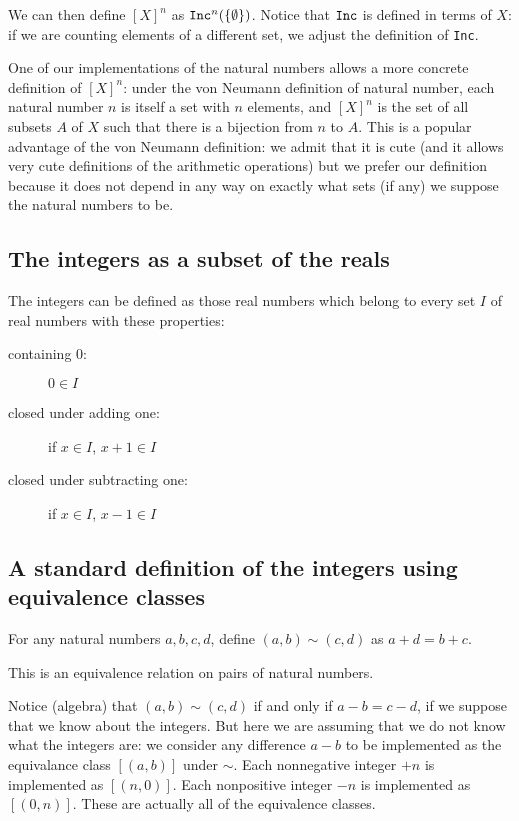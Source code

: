 \documentclass[12pt]{article}
\begin{document}
We can then define $[X]^n$ as ${\tt Inc}^n(\{\emptyset\})$.  Notice that ${\tt Inc}$ is defined in terms of $X$:  if we are counting elements of a different set, we adjust the definition of {\tt Inc}.

One of our implementations of the natural numbers allows a more concrete definition of $[X]^n$:  under the von Neumann
definition of natural number, each natural number $n$ is itself a set with $n$ elements, and $[X]^n$ is the set of all subsets $A$ of $X$  such that there is a bijection from $n$ to $A$.   This is a popular advantage of the von Neumann definition:  we admit that it is cute (and it allows very cute definitions of the arithmetic operations) but we prefer our definition because it does not depend in any way on exactly what sets (if any) we suppose the natural numbers to be.

\subsection{The integers as a subset of the reals}

The integers can be defined as those real numbers which belong to every set $I$ of real numbers with these properties:

\begin{description}

\item[containing 0:]  $0 \in I$

\item[closed under adding one:]  if $x\in I$, $x+1 \in I$

\item[closed under subtracting one:]  if $x \in I$, $x-1 \in I$

\end{description}


\subsection{A standard definition of the integers using equivalence classes}

For any natural numbers $a,b,c,d$, define $(a,b) \sim (c,d)$ as $a+d=b+c$.

This is an equivalence relation on pairs of natural numbers.

Notice (algebra) that $(a,b) \sim (c,d)$ if and only if $a-b = c-d$, if we suppose that we know about the integers.
But here we are assuming that we do not know what the integers are:  we consider any difference $a-b$ to be implemented
as the equivalance class $[(a,b)]$ under $\sim$.  Each nonnegative integer $+n$ is implemented as $[(n,0)]$.
Each nonpositive integer $-n$ is implemented as $[(0,n)]$.  These are actually all of the equivalence classes.
\end{document}
